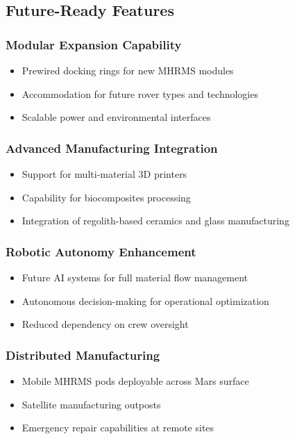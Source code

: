 \documentclass[12pt, a4paper]{article}
\begin{document}
\subsection{Future-Ready Features}

\subsubsection{Modular Expansion Capability}
\begin{itemize}
    \item Prewired docking rings for new MHRMS modules
    \item Accommodation for future rover types and technologies
    \item Scalable power and environmental interfaces
\end{itemize}

\subsubsection{Advanced Manufacturing Integration}
\begin{itemize}
    \item Support for multi-material 3D printers
    \item Capability for biocomposites processing
    \item Integration of regolith-based ceramics and glass manufacturing
\end{itemize}

\subsubsection{Robotic Autonomy Enhancement}
\begin{itemize}
    \item Future AI systems for full material flow management
    \item Autonomous decision-making for operational optimization
    \item Reduced dependency on crew oversight
\end{itemize}

\subsubsection{Distributed Manufacturing}
\begin{itemize}
    \item Mobile MHRMS pods deployable across Mars surface
    \item Satellite manufacturing outposts
    \item Emergency repair capabilities at remote sites
\end{itemize}
\end{document}
